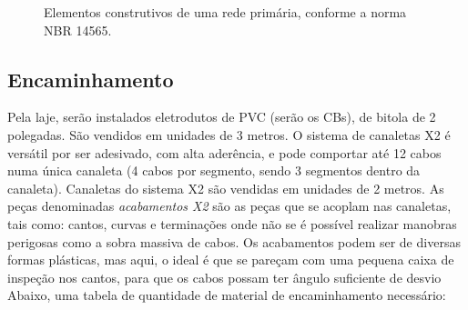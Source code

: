 \documentclass[	DIV=calc,%
							paper=a4,%
							fontsize=12pt,%
							onecolumn]{scrartcl}	 					%
\begin{document}
\begin{figure}[H]
	\noindent{}
	\caption{Elementos construtivos de uma rede primária, conforme a norma NBR 14565.}
	\label{fig3}
\end{figure}




\subsection{Encaminhamento}

Pela laje, serão instalados eletrodutos de PVC (serão os CBs), de bitola de 2 polegadas. São vendidos em unidades de 3 metros. O sistema de canaletas X2 é versátil por ser adesivado, com alta aderência, e pode comportar até 12 cabos numa única canaleta (4 cabos por segmento, sendo 3 segmentos dentro da canaleta). Canaletas do sistema X2 são vendidas em unidades de 2 metros. As peças denominadas \textit{acabamentos X2} são as peças que se acoplam nas canaletas, tais como: cantos, curvas e terminações onde não se é possível realizar manobras perigosas como a sobra massiva de cabos. Os acabamentos podem ser de diversas formas plásticas, mas aqui, o ideal é que se pareçam com uma pequena caixa de inspeção nos cantos, para que os cabos possam ter ângulo suficiente de desvio Abaixo, uma tabela de quantidade de material de encaminhamento necessário:
\end{document}
